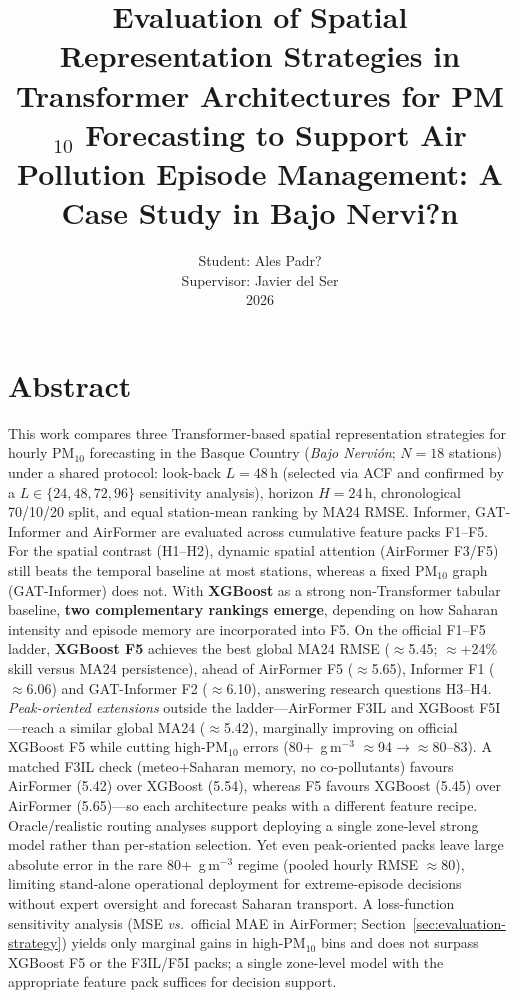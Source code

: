 \documentclass[11pt]{article}
\title{\textbf{Evaluation of Spatial Representation Strategies in Transformer Architectures for PM$_{10}$ Forecasting to Support Air Pollution Episode Management: A Case Study in Bajo Nervi?n}\\[0.4em]}
\author{
\normalsize
Student: Ales Padr?\\
Supervisor: Javier del Ser\\
2026
}
\date{}
\newcommand{\revnew}[1]{\textcolor{orange!75!black}{#1}}
\begin{document}
\maketitle
\vspace{-0.5em}

\section{Abstract}
\label{sec:abstract}

This work compares three Transformer-based spatial representation strategies for hourly PM$_{10}$ forecasting in the Basque Country (\textit{Bajo Nervi\'on}; $N{=}18$ stations) under a shared protocol: look-back $L{=}48$\,h (selected via ACF and confirmed by a $L\in\{24,48,72,96\}$ sensitivity analysis), horizon $H{=}24$\,h, chronological 70/10/20 split, and equal station-mean ranking by MA24 RMSE. Informer, GAT-Informer and AirFormer are evaluated across cumulative feature packs F1--F5. For the spatial contrast (H1--H2), dynamic spatial attention (AirFormer F3/F5) still beats the temporal baseline at most stations, whereas a fixed PM$_{10}$ graph (GAT-Informer) does not. With \textbf{XGBoost} as a strong non-Transformer tabular baseline, \textbf{two complementary rankings emerge}, depending on how Saharan intensity and episode memory are incorporated into F5. On the official F1--F5 ladder, \textbf{XGBoost F5} achieves the best global MA24 RMSE ($\approx$5.45; $\approx$+24\% skill versus MA24 persistence), ahead of AirFormer F5 ($\approx$5.65), Informer F1 ($\approx$6.06) and GAT-Informer F2 ($\approx$6.10), answering research questions H3--H4. \emph{Peak-oriented extensions} outside the ladder---AirFormer F3IL and XGBoost F5I---reach a similar global MA24 ($\approx$5.42), marginally improving on official XGBoost F5 while cutting high-PM$_{10}$ errors (80+~\textmu g\,m$^{-3}$ $\approx$94$\to$$\approx$80--83). A matched F3IL check (meteo+Saharan memory, no co-pollutants) favours AirFormer (5.42) over XGBoost (5.54), whereas F5 favours XGBoost (5.45) over AirFormer (5.65)---so each architecture peaks with a different feature recipe. Oracle/realistic routing analyses support deploying a single zone-level strong model rather than per-station selection. Yet even peak-oriented packs leave large absolute error in the rare 80+~\textmu g\,m$^{-3}$ regime (pooled hourly RMSE $\approx$80), limiting stand-alone operational deployment for extreme-episode decisions without expert oversight and forecast Saharan transport.
\revnew{A loss-function sensitivity analysis (MSE \emph{vs.}\ official MAE in AirFormer; Section~\ref{sec:evaluation-strategy}) yields only marginal gains in high-PM$_{10}$ bins and does not surpass XGBoost F5 or the F3IL/F5I packs; a single zone-level model with the appropriate feature pack suffices for decision support.}
\end{document}
